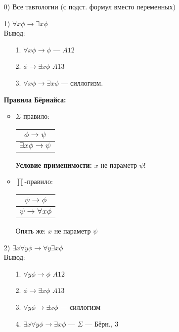 \begin{itemize}
  \item [0) ] Все тавтологии (с подст. формул вместо переменных)
  \item [1) ] $\forall x \phi \rightarrow \exists x \phi$ \\
Вывод:
\begin{itemize}
  \item [1. ] $\forall x \phi \rightarrow \phi$ --- $A12$ \\
  \item [2. ] $\phi \rightarrow \exists x\phi$ $A13$ \\
  \item [3. ] $\forall x \phi \rightarrow \exists x \phi$ --- силлогизм.
\end{itemize}
\textbf{Правила Бёрнайса:}
\begin{itemize}
  \item $\Sigma$-правило:
    \begin{center}
    \begin{tabular}{ c} 
      $\phi \rightarrow \psi$ \\
     \hline
     $\exists x \phi \rightarrow \psi$
    \end{tabular}
    \end{center}
    \begin{note}
    \textbf{Условие применимости:} $x$ не параметр $\psi$!
    \end{note}
  \item $\prod$-правило:
    \begin{center}
    \begin{tabular}{ c } 
      $\psi \rightarrow \phi$ \\
     \hline
      $\psi \rightarrow \forall x \phi$
    \end{tabular}
    \end{center}
    Опять же: $x$ не параметр  $\psi$
\end{itemize}
\item [2) ] $\exists x \forall y \phi \rightarrow \forall y \exists x \phi$ \\
   Вывод:
   \begin{itemize}
     \item [1.] $\forall y \phi \rightarrow \phi$ $A12$ \\
     \item [2. ] $\phi \rightarrow \exists x \phi$ $A13$
     \item [3. ] $\forall y \phi \rightarrow \exists x \phi$ --- силлогизм
     \item [4.] $\exists x \forall y \phi \rightarrow \exists x\phi$ --- $\Sigma$ --- Бёрн., $3$ 

\end{itemize}
\end{itemize}
